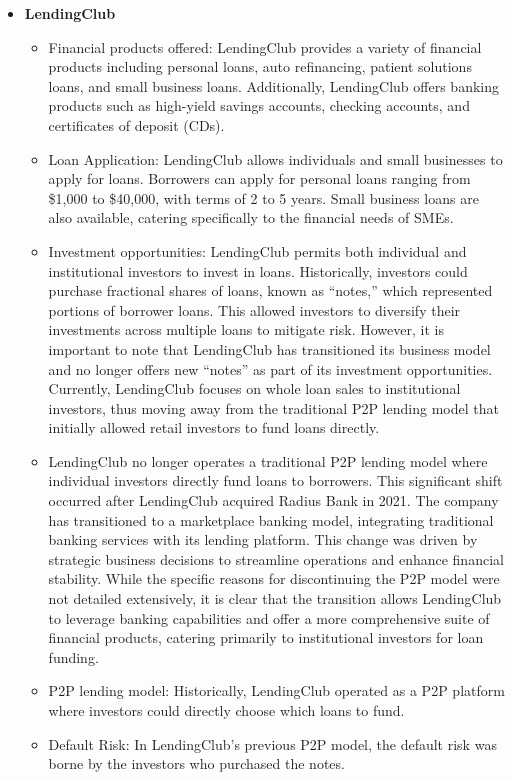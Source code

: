 \documentclass{article}
\begin{document}
\begin{itemize}
    \item \textbf{LendingClub}
        \begin{itemize}
            \item Financial products offered: LendingClub provides a variety of financial products including personal loans, auto refinancing, patient solutions loans, and small business loans. Additionally, LendingClub offers banking products such as high-yield savings accounts, checking accounts, and certificates of deposit (CDs).
            \item Loan Application: LendingClub allows individuals and small businesses to apply for loans. Borrowers can apply for personal loans ranging from \$1,000 to \$40,000, with terms of 2 to 5 years. Small business loans are also available, catering specifically to the financial needs of SMEs.
            \item Investment opportunities: LendingClub permits both individual and institutional investors to invest in loans. Historically, investors could purchase fractional shares of loans, known as “notes,” which represented portions of borrower loans. This allowed investors to diversify their investments across multiple loans to mitigate risk. However, it is important to note that LendingClub has transitioned its business model and no longer offers new “notes” as part of its investment opportunities. Currently, LendingClub focuses on whole loan sales to institutional investors, thus moving away from the traditional P2P lending model that initially allowed retail investors to fund loans directly.
            \item LendingClub no longer operates a traditional P2P lending model where individual investors directly fund loans to borrowers. This significant shift occurred after LendingClub acquired Radius Bank in 2021. The company has transitioned to a marketplace banking model, integrating traditional banking services with its lending platform. This change was driven by strategic business decisions to streamline operations and enhance financial stability. While the specific reasons for discontinuing the P2P model were not detailed extensively, it is clear that the transition allows LendingClub to leverage banking capabilities and offer a more comprehensive suite of financial products, catering primarily to institutional investors for loan funding.
            \item P2P lending model: Historically, LendingClub operated as a P2P platform where investors could directly choose which loans to fund.
            \item Default Risk: In LendingClub’s previous P2P model, the default risk was borne by the investors who purchased the notes.
        \end{itemize}  


\end{itemize}
\end{document}
